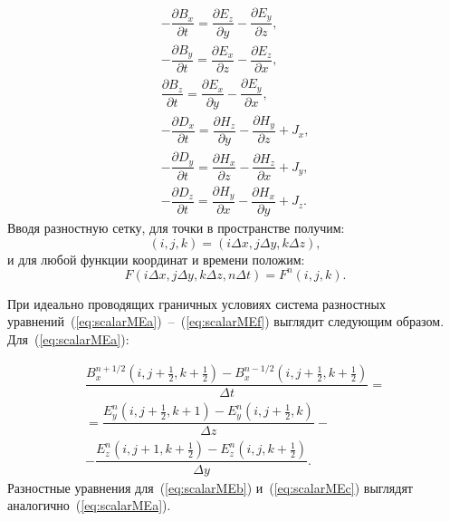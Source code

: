 \begin{subequations}
\begin{gather}
- \dfrac{\partial B_x}{\partial t} = \dfrac{\partial E_z}{\partial y} - \dfrac{\partial E_y}{\partial z} \label{eq:scalarMEa}, \\
- \dfrac{\partial B_y}{\partial t} = \dfrac{\partial E_x}{\partial z} - \dfrac{\partial E_z}{\partial x} \label{eq:scalarMEb}, \\
\dfrac{\partial B_z}{\partial t} = \dfrac{\partial E_x}{\partial y} - \dfrac{\partial E_y}{\partial x} \label{eq:scalarMEc}, \\
- \dfrac{\partial D_x}{\partial t} = \dfrac{\partial H_z}{\partial y} - \dfrac{\partial H_y}{\partial z}+J_x \label{eq:scalarMEd}, \\
- \dfrac{\partial D_y}{\partial t} = \dfrac{\partial H_x}{\partial z} - \dfrac{\partial H_z}{\partial x}+J_y \label{eq:scalarMEe}, \\
- \dfrac{\partial D_z}{\partial t} = \dfrac{\partial H_y}{\partial x} - \dfrac{\partial H_x}{\partial y}+J_z \label{eq:scalarMEf}.
\end{gather}
\end{subequations}
Вводя разностную сетку, для точки в пространстве получим:
\begin{equation}
(i, j, k) = (i \Delta x, j \Delta y, k \Delta z),
\label{eq:pointgrid}
\end{equation}
и для любой функции координат и времени положим:
\begin{equation}
F(i \Delta x, j \Delta y, k \Delta z, n \Delta t ) = F^n (i, j, k).
\label{eq:funcgrid}
\end{equation}

При идеально проводящих граничных условиях система разностных уравнений~(\ref{eq:scalarMEa})~--~(\ref{eq:scalarMEf}) выглядит следующим образом. Для~(\ref{eq:scalarMEa}):

\begin{multline}
\dfrac{B_{x} ^{n + 1/2}(i, j + \frac{1}{2}, k + \frac{1}{2}) - B_{x} ^{n - 1/2}(i, j + \frac{1}{2}, k + \frac{1}{2}) }{\Delta t}  =\\
= \dfrac{E_{y} ^{n} (i, j + \frac{1}{2}, k + 1) - E_{y} ^{n} (i, j + \frac{1}{2}, k)}{\Delta z} - \\
- \dfrac{E_{z} ^{n} (i, j + 1, k + \frac{1}{2}) - E_{z} ^{n} (i, j, k + \frac{1}{2})}{\Delta y}.
\label{eq:gridScalarA}
\end{multline}
Разностные уравнения для~(\ref{eq:scalarMEb}) и~(\ref{eq:scalarMEc}) выглядят аналогично~(\ref{eq:scalarMEa}).

